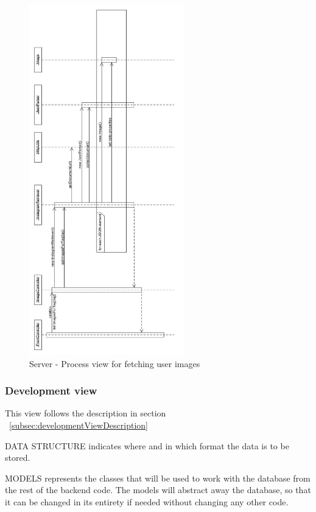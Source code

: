 \documentclass[11pt]{book}
\begin{document}
\begin{figure}[H]
      \centering
      \includegraphics[width=0.6\textwidth]{Figures/Architecture/Sequence/image.jpg}
      \caption{Server - Process view for fetching user images}
      \label{fig:arch_server_process_image}
\end{figure}

\subsubsection{Development view}
This view follows the description in section ~\ref{subsec:developmentViewDescription}

DATA STRUCTURE indicates where and in which format the data is to be stored.

MODELS represents the classes that will be used to work with the database from the rest of the backend code. The models will abstract away the database, so that it can be changed in its entirety if needed without changing any other code.
\end{document}
